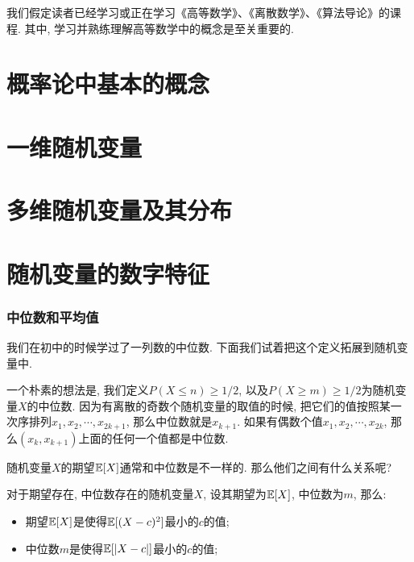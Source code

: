 
\usepackage{ctex}
\usepackage{pifont}
\usepackage{cleveref}
\usepackage{pstricks}
\usepackage{pgfplots}





我们假定读者已经学习或正在学习《高等数学》、《离散数学》、《算法导论》的课程. 其中, 学习并熟练理解高等数学中的概念是至关重要的. 

\part{概率论中基本的概念}


\begin{shaded}
    
\end{shaded}


\begin{shaded}
    
\end{shaded}

\part{一维随机变量}





\part{多维随机变量及其分布}





\part{随机变量的数字特征}







\section{中位数和平均值}

我们在初中的时候学过了一列数的中位数. 下面我们试着把这个定义拓展到随机变量中. 

一个朴素的想法是, 我们定义$P(X\leq n)\geq 1/2$, 以及$P(X\geq m)\geq 1/2$为随机变量$X$的中位数. 因为有离散的奇数个随机变量的取值的时候, 把它们的值按照某一次序排列$x_1, x_2, \cdots, x_{2k+1}$, 那么中位数就是$x_{k+1}$. 如果有偶数个值$x_1, x_2, \cdots, x_{2k}$, 那么$(x_k, x_{k+1})$上面的任何一个值都是中位数. 

随机变量$X$的期望$\mathbb E[X]$通常和中位数是不一样的. 那么他们之间有什么关系呢? 

\begin{theorem}
    对于期望存在, 中位数存在的随机变量$X$, 设其期望为$\mathbb E[X]$, 中位数为$m$, 那么: 
    \begin{itemize}
        \item 期望$\mathbb E[X]$是使得$\mathbb E[(X-c)^2]$最小的$c$的值;
        \item 中位数$m$是使得$\mathbb E[|X-c|]$最小的$c$的值;
    \end{itemize}
\end{theorem}




